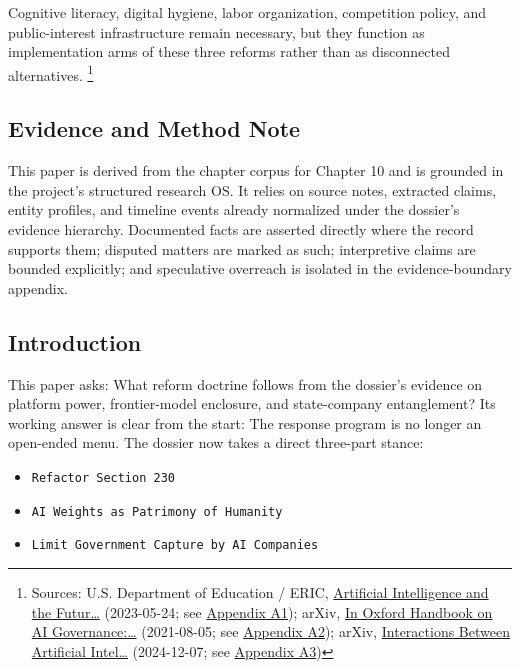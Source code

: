 \documentclass[
  american,
  11pt,
  letterpaper,
]{article}
\providecommand{\tightlist}{%
  \setlength{\itemsep}{0pt}\setlength{\parskip}{0pt}}
\begin{document}
Cognitive literacy, digital hygiene, labor organization, competition
policy, and public-interest infrastructure remain necessary, but they
function as implementation arms of these three reforms rather than as
disconnected alternatives. \footnote{Sources: U.S. Department of
  Education / ERIC, \href{https://eric.ed.gov/?id=ED631097}{Artificial
  Intelligence and the Futur\ldots{}} (2023-05-24; see
  \hyperref[ch-10-appendix-a1-artificial-intelligence-and-the-future-of-teaching-and-learning-insights-and-recommendations]{Appendix
  A1}); arXiv, \href{https://arxiv.org/abs/2108.07700}{In Oxford
  Handbook on AI Governance:\ldots{}} (2021-08-05; see
  \hyperref[ch-10-appendix-a2-in-oxford-handbook-on-ai-governance-the-role-of-workers-in-ai-ethics-and-governance]{Appendix
  A2}); arXiv, \href{https://arxiv.org/abs/2412.05761}{Interactions
  Between Artificial Intel\ldots{}} (2024-12-07; see
  \hyperref[ch-10-appendix-a3-interactions-between-artificial-intelligence-and-digital-public-infrastructure-concepts-benefits-and-challenges]{Appendix
  A3})}

\subsection{Evidence and Method Note}\label{evidence-and-method-note-10}

This paper is derived from the chapter corpus for Chapter 10 and is
grounded in the project's structured research OS. It relies on source
notes, extracted claims, entity profiles, and timeline events already
normalized under the dossier's evidence hierarchy. Documented facts are
asserted directly where the record supports them; disputed matters are
marked as such; interpretive claims are bounded explicitly; and
speculative overreach is isolated in the evidence-boundary appendix.

\subsection{Introduction}\label{introduction-10}

This paper asks: What reform doctrine follows from the dossier's
evidence on platform power, frontier-model enclosure, and state-company
entanglement? Its working answer is clear from the start: The response
program is no longer an open-ended menu. The dossier now takes a direct
three-part stance:

\begin{itemize}
\tightlist
\item
  \texttt{Refactor\ Section\ 230}
\item
  \texttt{AI\ Weights\ as\ Patrimony\ of\ Humanity}
\item
  \texttt{Limit\ Government\ Capture\ by\ AI\ Companies}
\end{itemize}
\end{document}
